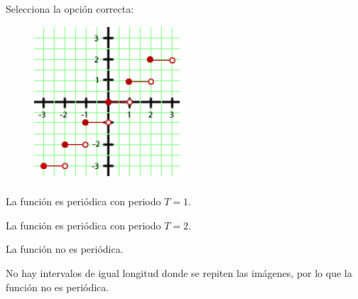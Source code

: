 \begin{scq}
	Selecciona la opción correcta:\\
	\begin{figure}
		\includegraphics{samples/propiedades/periodicidad4.jpg}
	\end{figure}
	\begin{choices}
		\begin{choice}
			La función es periódica con periodo $T=1$.	
		\end{choice}
		\begin{choice}[x]
			La función es periódica con periodo $T=2$.
		\end{choice}	
		\begin{choice}[x]
			La función no es periódica.
		\end{choice}
	\end{choices}
	\begin{feedback}
		No hay intervalos de igual longitud donde se repiten las imágenes, por lo que la función no es periódica.
	\end{feedback}
\end{scq}



